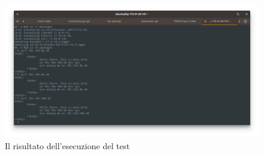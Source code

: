\begin{figure}[h]
	\includegraphics[scale=0.35]{img/test1-result}
	\caption{Il risultato dell'esecuzione del test}
	\label{fig:test1-result}
\end{figure}

